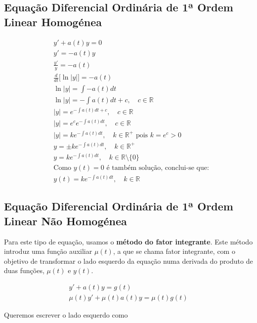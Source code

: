 \documentclass{article}
\begin{document}
\subsection{Equação Diferencial Ordinária de 1ª Ordem Linear Homogénea}
\label{subsec: edo-ordem1-linear-homogenea}

\begin{align*}
& \boxed{y' + a(t) y = 0} \\
& y' = -a(t) y \\
& \frac{y'}{y} = -a(t) \\
& \frac{d}{dt} \Big[ \ln|y| \Big] = -a(t) \\
& \ln|y| = \int -a(t) dt \\
& \ln|y| = - \int a(t) dt + c, \quad c \in \mathbb{R} \\
& |y| = e^{-\int a(t) dt + c}, \quad c \in \mathbb{R} \\
& |y| = e^c e^{-\int a(t) dt}, \quad c \in \mathbb{R} \\
& |y| = k e^{-\int a(t) dt}, \quad k \in \mathbb{R}^+ \text{ pois } k = e^c > 0 \\
& y = \pm k e^{-\int a(t) dt}, \quad k \in \mathbb{R}^+ \\
& y = k e^{-\int a(t) dt}, \quad k \in \mathbb{R} \setminus \{0\} \\
& \text{Como } y(t) = 0 \text{ é também solução, conclui-se que:} \\
& \boxed{y(t) = k e^{-\int a(t) dt}, \quad k \in \mathbb{R}}
\end{align*}

\bigskip

\subsection{Equação Diferencial Ordinária de 1ª Ordem Linear Não Homogénea}
\label{subsec: edo-ordem1-linear-nao-homogenea}

Para este tipo de equação, usamos o \textbf{método do fator integrante}.
Este método introduz uma função auxiliar $\mu(t)$, a que se chama fator integrante,
com o objetivo de transformar o lado esquerdo da equação numa derivada do produto de duas funções, $\mu(t)$ e $y(t)$.

\begin{gather*}
\boxed{y' + a(t) y = g(t)} \\
\mu(t) y' + \mu(t) a(t) y = \mu(t) g(t)
\end{gather*}

Queremos escrever o lado esquerdo como
\end{document}
